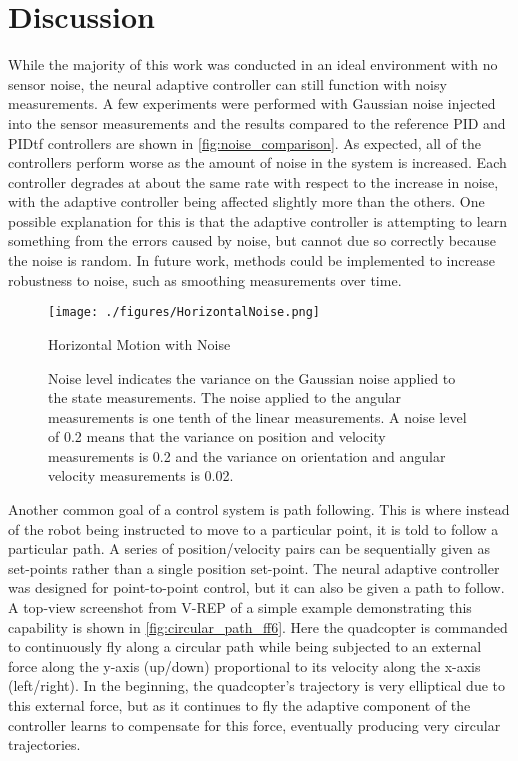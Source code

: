 \documentclass[letterpaper,12pt,titlepage,oneside,final]{book}
\begin{document}
\section{Discussion}

While the majority of this work was conducted in an ideal environment with no sensor noise, the neural adaptive controller can still function with noisy measurements.
A few experiments were performed with Gaussian noise injected into the sensor measurements and the results compared to the reference PID and PIDtf controllers are shown in \autoref{fig:noise_comparison}.
As expected, all of the controllers perform worse as the amount of noise in the system is increased.
Each controller degrades at about the same rate with respect to the increase in noise, with the adaptive controller being affected slightly more than the others.
One possible explanation for this is that the adaptive controller is attempting to learn something from the errors caused by noise, but cannot due so correctly because the noise is random.
In future work, methods could be implemented to increase robustness to noise, such as smoothing measurements over time.

\begin{figure}
\centering
\texttt{[image: ./figures/HorizontalNoise.png]}
\caption{Horizontal Motion with Noise}
\label{fig:noise_comparison}
\captionsetup{singlelinecheck=off,font=footnotesize}
\caption*{
Noise level indicates the variance on the Gaussian noise applied to the state measurements. The noise applied to the angular measurements is one tenth of the linear measurements. A noise level of 0.2 means that the variance on position and velocity measurements is 0.2 and the variance on orientation and angular velocity measurements is 0.02.}
\end{figure}

Another common goal of a control system is path following.
This is where instead of the robot being instructed to move to a particular point, it is told to follow a particular path.
A series of position/velocity pairs can be sequentially given as set-points rather than a single position set-point.
The neural adaptive controller was designed for point-to-point control, but it can also be given a path to follow.
A top-view screenshot from V-REP of a simple example demonstrating this capability is shown in \autoref{fig:circular_path_ff6}.
Here the quadcopter is commanded to continuously fly along a circular path while being subjected to an external force along the y-axis (up/down) proportional to its velocity along the x-axis (left/right).
In the beginning, the quadcopter's trajectory is very elliptical due to this external force, but as it continues to fly the adaptive component of the controller learns to compensate for this force, eventually producing very circular trajectories.
\end{document}

